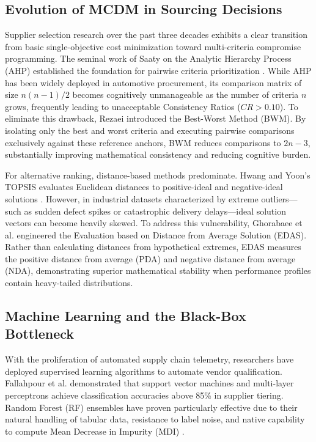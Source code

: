 \documentclass[twocolumn,10pt]{article}
\begin{document}
\subsection{Evolution of MCDM in Sourcing Decisions}
Supplier selection research over the past three decades exhibits a clear transition from basic single-objective cost minimization toward multi-criteria compromise programming. The seminal work of Saaty on the Analytic Hierarchy Process (AHP) established the foundation for pairwise criteria prioritization \cite{saaty1988analytic}. While AHP has been widely deployed in automotive procurement, its comparison matrix of size $n(n-1)/2$ becomes cognitively unmanageable as the number of criteria $n$ grows, frequently leading to unacceptable Consistency Ratios ($CR > 0.10$). To eliminate this drawback, Rezaei \cite{rezaei2015best, rezaei2016supplier} introduced the Best-Worst Method (BWM). By isolating only the best and worst criteria and executing pairwise comparisons exclusively against these reference anchors, BWM reduces comparisons to $2n - 3$, substantially improving mathematical consistency and reducing cognitive burden.

For alternative ranking, distance-based methods predominate. Hwang and Yoon's TOPSIS evaluates Euclidean distances to positive-ideal and negative-ideal solutions \cite{hwang1981methods}. However, in industrial datasets characterized by extreme outliers—such as sudden defect spikes or catastrophic delivery delays—ideal solution vectors can become heavily skewed. To address this vulnerability, Ghorabaee et al. \cite{ghorabaee2015evaluation} engineered the Evaluation based on Distance from Average Solution (EDAS). Rather than calculating distances from hypothetical extremes, EDAS measures the positive distance from average (PDA) and negative distance from average (NDA), demonstrating superior mathematical stability when performance profiles contain heavy-tailed distributions.

\subsection{Machine Learning and the Black-Box Bottleneck}
With the proliferation of automated supply chain telemetry, researchers have deployed supervised learning algorithms to automate vendor qualification. Fallahpour et al. \cite{fallahpour2021hyper} demonstrated that support vector machines and multi-layer perceptrons achieve classification accuracies above 85\% in supplier tiering. Random Forest (RF) ensembles have proven particularly effective due to their natural handling of tabular data, resistance to label noise, and native capability to compute Mean Decrease in Impurity (MDI) \cite{breiman2001random}.
\end{document}
